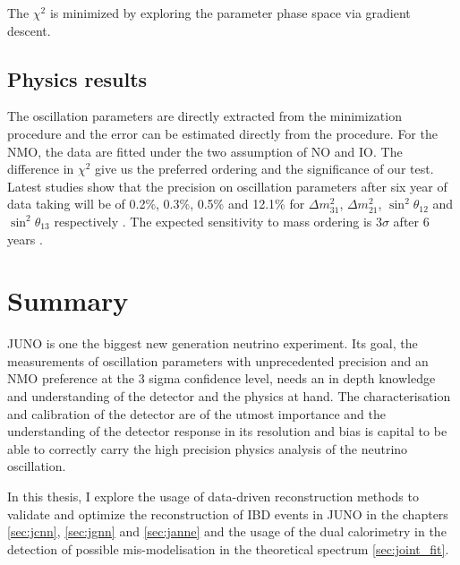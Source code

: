 The $\chi^2$ is minimized by exploring the parameter phase space via gradient descent.

\subsection{Physics results}

The oscillation parameters are directly extracted from the minimization procedure and the error can be estimated directly from the procedure. For the NMO, the data are fitted under the two assumption of NO and IO. The difference in $\chi^2$ give us the preferred ordering and the significance of our test. Latest studies show that the precision on oscillation parameters after six year of data taking will be of 0.2\%, 0.3\%, 0.5\% and 12.1\% for $\Delta m^2_{31}$, $\Delta m^2_{21}$, $\sin^2\theta_{12}$ and $\sin^2\theta_{13}$ respectively \cite{juno_collaboration_sub-percent_2022}. The expected sensitivity to mass ordering is $3\sigma$ after 6 years \cite{juno_collaboration_juno_2022}.

\section{Summary}

JUNO is one the biggest new generation neutrino experiment. Its goal, the measurements of oscillation parameters with unprecedented precision and an NMO preference at the 3 sigma confidence level, needs an in depth knowledge and understanding of the detector and the physics at hand. The characterisation and calibration of the detector are of the utmost importance and the understanding of the detector response in its resolution and bias is capital to be able to correctly carry the high precision physics analysis of the neutrino oscillation.

In this thesis, I explore the usage of data-driven reconstruction methods to validate and optimize the reconstruction of IBD events in JUNO in the chapters \ref{sec:jcnn}, \ref{sec:jgnn} and \ref{sec:janne} and the usage of the dual calorimetry in the detection of possible mis-modelisation in the theoretical spectrum \ref{sec:joint_fit}.

